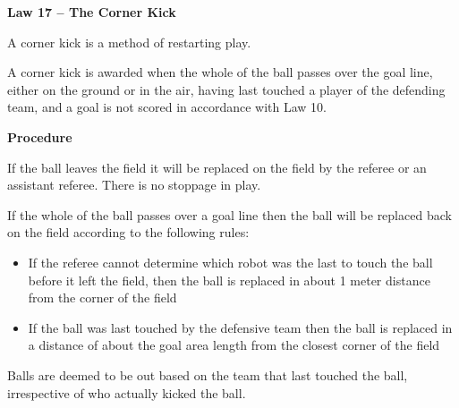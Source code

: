 \clearpage
\sffamily
{\bfseries\color[rgb]{0.4,0.4,0.4}
Law 17 -- The Corner Kick}
{}


\bigskip

A corner kick is a method of restarting play.

\bigskip

A corner kick is awarded when the whole of the ball passes over the goal
line, either on the ground or in the air, having last touched a player
of the defending team, and a goal is not scored in accordance with Law
10.


\bigskip

{\bfseries Procedure}

\headlinebox

If the ball leaves the field it will be replaced on the field by the
referee or an assistant referee. There is no stoppage in play. 

If the whole of the ball passes over a goal line then the ball will be
replaced back on the field according to the following rules: 

\begin{itemize}
\item If the referee cannot determine which robot was the last to touch
the ball before it left the field, then the ball is replaced in about 1
meter distance from the corner of the field
\item If the ball was last touched by the defensive team then the ball
is replaced in a distance of about the goal area length from the
closest corner of the field
\end{itemize}

Balls are deemed to be out based on the team that last touched the ball,
irrespective of who actually kicked the ball. 

\bigskip


